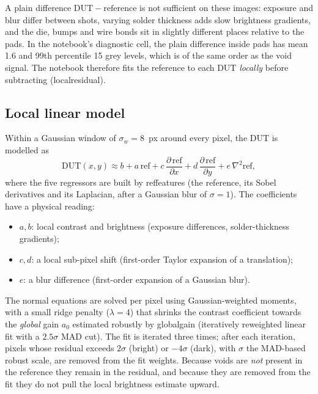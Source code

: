 \documentclass[11pt,a4paper]{article}
\newcommand{\code}[1]{{\ttfamily\def\_{\textunderscore\allowbreak}#1}}
\begin{document}
A plain difference $\mathrm{DUT} - \mathrm{reference}$ is not sufficient on these images: exposure
and blur differ between shots, varying solder thickness adds slow brightness gradients, and the
die, bumps and wire bonds sit in slightly different places relative to the pads. In the
notebook's diagnostic cell, the plain difference inside pads has mean 1.6 and 99th percentile
15 grey levels, which is of the same order as the void signal. The notebook therefore fits the
reference to each DUT \emph{locally} before subtracting (\code{\_local\_residual}).

\subsection{Local linear model}

Within a Gaussian window of $\sigma_w = 8$~px around every pixel, the DUT is modelled as
\begin{equation}
  \mathrm{DUT}(x,y) \approx b + a\,\mathrm{ref} + c\,\frac{\partial\,\mathrm{ref}}{\partial x}
  + d\,\frac{\partial\,\mathrm{ref}}{\partial y} + e\,\nabla^2 \mathrm{ref},
  \label{eq:localfit}
\end{equation}
where the five regressors are built by \code{\_ref\_features} (the reference, its Sobel
derivatives and its Laplacian, after a Gaussian blur of $\sigma = 1$). The coefficients have a
physical reading:
\begin{itemize}[nosep]
  \item $a, b$: local contrast and brightness (exposure differences, solder-thickness gradients);
  \item $c, d$: a local sub-pixel shift (first-order Taylor expansion of a translation);
  \item $e$: a blur difference (first-order expansion of a Gaussian blur).
\end{itemize}
The normal equations are solved per pixel using Gaussian-weighted moments, with a small ridge
penalty ($\lambda = 4$) that shrinks the contrast coefficient towards the \emph{global} gain
$a_0$ estimated robustly by \code{\_global\_gain} (iteratively reweighted linear fit with a
$2.5\sigma$ MAD cut). The fit is iterated three times; after each iteration, pixels whose
residual exceeds $2\sigma$ (bright) or $-4\sigma$ (dark), with $\sigma$ the MAD-based robust
scale, are removed from the fit weights. Because voids are \emph{not} present in the reference
they remain in the residual, and because they are removed from the fit they do not pull the
local brightness estimate upward.
\end{document}
